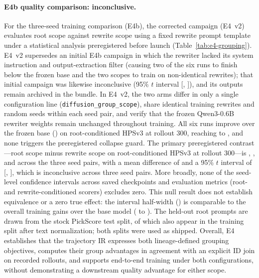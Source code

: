\documentclass[10pt]{article}
\begin{document}
\paragraph{E4b quality comparison: inconclusive.}
For the three-seed training comparison (E4b), the corrected campaign (E4~v2) evaluates root scope against rewrite scope using a fixed rewrite prompt template under a statistical analysis preregistered before launch (Table~\ref{tab:e4-grouping}).
E4~v2 supersedes an initial E4b campaign in which the rewriter lacked its system instruction and output-extraction filter (causing two of the six runs to finish below the frozen base and the two scopes to train on non-identical rewrites); that initial campaign was likewise inconclusive (95\% $t$ interval [\EFourEarlierLow{}, \EFourEarlierHigh{}]), and its outputs remain archived in the bundle.
In E4~v2, the two arms differ in only a single configuration line (\texttt{diffusion\_group\_scope}), share identical training rewrites and random seeds within each seed pair, and verify that the frozen Qwen3-0.6B rewriter weights remain unchanged throughout training.
All six runs improve over the frozen base (\EFourVTwoBase{}) on root-conditioned HPSv3 at rollout 300, reaching \EFourVTwoEndMin{} to \EFourVTwoEndMax{}, and none triggers the preregistered collapse guard.
The primary preregistered contrast---root scope minus rewrite scope on root-conditioned HPSv3 at rollout 300---is \EFourVTwoContrastEleven{}, \EFourVTwoContrastTwentyTwo{}, and \EFourVTwoContrastThirtyThree{} across the three seed pairs, with a mean difference of \EFourVTwoMean{} and a 95\% $t$ interval of [\EFourVTwoLow{}, \EFourVTwoHigh{}], which is inconclusive across three seed pairs.
More broadly, none of the \EFourVTwoIntervals{} seed-level confidence intervals across saved checkpoints and evaluation metrics (root- and rewrite-conditioned scorers) excludes zero.
This null result does not establish equivalence or a zero true effect: the interval half-width (\EFourVTwoHalfWidth{}) is comparable to the overall training gains over the base model (\EFourVTwoGainMin{} to \EFourVTwoGainMax{}).
The held-out root prompts are drawn from the stock PickScore test split, \EZeroSplitOverlap{} of which also appear in the training split after text normalization; both splits were used as shipped.
Overall, E4 establishes that the trajectory IR expresses both lineage-defined grouping objectives, computes their group advantages in agreement with an explicit ID join on recorded rollouts, and supports end-to-end training under both configurations, without demonstrating a downstream quality advantage for either scope.
\end{document}

